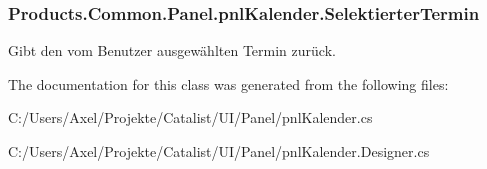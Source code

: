 \subsubsection[{\texorpdfstring{Selektierter\+Termin}{SelektierterTermin}}]{ Products.\+Common.\+Panel.\+pnl\+Kalender.\+Selektierter\+Termin\hspace{0.3cm}{\ttfamily [get]}}\hypertarget{class_products_1_1_common_1_1_panel_1_1pnl_kalender_a762c2039b6cfe497338ac9f54fe72086}{}\label{class_products_1_1_common_1_1_panel_1_1pnl_kalender_a762c2039b6cfe497338ac9f54fe72086}


Gibt den vom Benutzer ausgewählten Termin zurück. 



The documentation for this class was generated from the following files\+:\begin{DoxyCompactItemize}
\item 
C\+:/\+Users/\+Axel/\+Projekte/\+Catalist/\+U\+I/\+Panel/pnl\+Kalender.\+cs\item 
C\+:/\+Users/\+Axel/\+Projekte/\+Catalist/\+U\+I/\+Panel/pnl\+Kalender.\+Designer.\+cs\end{DoxyCompactItemize}
